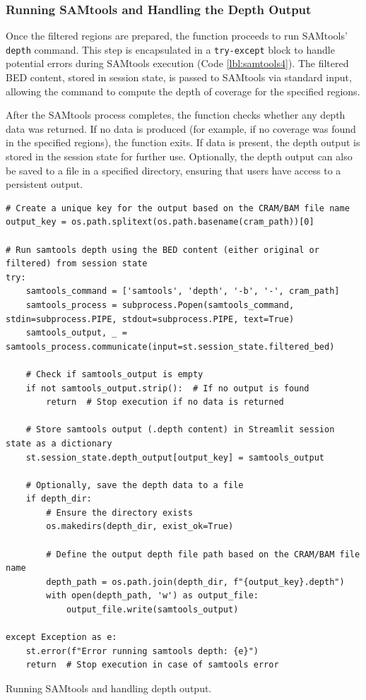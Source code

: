 \subsubsection{\textbf{Running SAMtools and Handling the Depth Output}}

Once the filtered regions are prepared, the function proceeds to run SAMtools' \texttt{depth} command. This step is encapsulated in a \texttt{try-except} block to handle potential errors during SAMtools execution (Code \ref{lbl:samtools4}). The filtered BED content, stored in session state, is passed to SAMtools via standard input, allowing the command to compute the depth of coverage for the specified regions.

After the SAMtools process completes, the function checks whether any depth data was returned. If no data is produced (for example, if no coverage was found in the specified regions), the function exits. If data is present, the depth output is stored in the session state for further use. Optionally, the depth output can also be saved to a file in a specified directory, ensuring that users have access to a persistent output.

\begin{longlisting}
\begin{verbatim}
# Create a unique key for the output based on the CRAM/BAM file name
output_key = os.path.splitext(os.path.basename(cram_path))[0]

# Run samtools depth using the BED content (either original or filtered) from session state
try:
    samtools_command = ['samtools', 'depth', '-b', '-', cram_path]
    samtools_process = subprocess.Popen(samtools_command, stdin=subprocess.PIPE, stdout=subprocess.PIPE, text=True)
    samtools_output, _ = samtools_process.communicate(input=st.session_state.filtered_bed)

    # Check if samtools_output is empty
    if not samtools_output.strip():  # If no output is found
        return  # Stop execution if no data is returned

    # Store samtools output (.depth content) in Streamlit session state as a dictionary
    st.session_state.depth_output[output_key] = samtools_output

    # Optionally, save the depth data to a file
    if depth_dir:
        # Ensure the directory exists
        os.makedirs(depth_dir, exist_ok=True)

        # Define the output depth file path based on the CRAM/BAM file name
        depth_path = os.path.join(depth_dir, f"{output_key}.depth")
        with open(depth_path, 'w') as output_file:
            output_file.write(samtools_output)

except Exception as e:
    st.error(f"Error running samtools depth: {e}")
    return  # Stop execution in case of samtools error
\end{verbatim}
\caption{Running SAMtools and handling depth output.}
\label{lbl:samtools4}
\end{longlisting}

